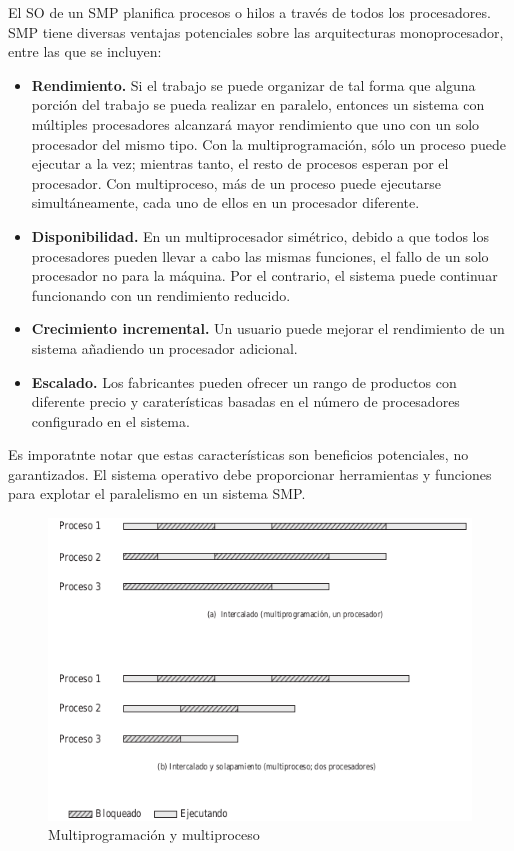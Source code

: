 \documentclass{article}
\begin{document}
			El SO de un SMP planifica procesos o hilos a través de todos los procesadores. SMP tiene diversas ventajas potenciales sobre las arquitecturas monoprocesador, entre las que se incluyen:
			
			\begin{itemize}
			\item \textbf{Rendimiento.} Si el trabajo se puede organizar de tal forma que alguna porción del trabajo se pueda realizar en paralelo, entonces un sistema con múltiples procesadores alcanzará mayor rendimiento que uno con un solo procesador del mismo tipo. Con la multiprogramación, sólo un proceso puede ejecutar a la vez; mientras tanto, el resto de procesos esperan por el procesador. Con multiproceso, más de un proceso puede ejecutarse simultáneamente, cada uno de ellos en un procesador diferente.
			\item \textbf{Disponibilidad.} En un multiprocesador simétrico, debido a que todos los procesadores pueden llevar a cabo las mismas funciones, el fallo de un solo procesador no para la máquina. Por el contrario, el sistema puede continuar funcionando con un rendimiento reducido.
			\item \textbf{Crecimiento incremental.} Un usuario puede mejorar el rendimiento de un sistema añadiendo un procesador adicional.
			\item \textbf{Escalado.} Los fabricantes pueden ofrecer un rango de productos con diferente precio y caraterísticas basadas en el número de procesadores configurado en el sistema.
			\end{itemize}	
			
			Es imporatnte notar que estas características son beneficios potenciales, no garantizados. El sistema operativo debe proporcionar herramientas y funciones para explotar el paralelismo en un sistema SMP.	\\
			
			\begin{figure}
			\caption{Multiprogramación y multiproceso}
			\label{figura22:multiprogramacion_multiproceso}
			\centering
			\includegraphics[width=1\textwidth, scale=1]{figura22.png}
			\end{figure}
			
\end{document}
